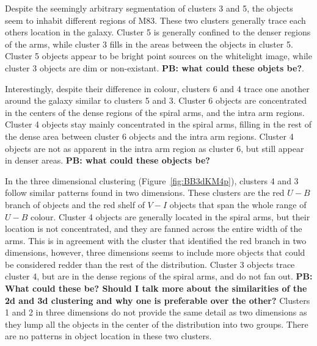 Despite the seemingly arbitrary segmentation of clusters 3 and 5, the objects seem to inhabit different regions of M83.
These two clusters generally trace each others location in the galaxy. 
Cluster 5 is generally confined to the denser regions of the arms, while cluster 3 fills in the areas between the objects in cluster 5.
Cluster 5 objects appear to be bright point sources on the whitelight image, while cluster 3 objects are dim or non-existant.
\textbf{PB: what could these objets be?}.

Interestingly, despite their difference in colour, clusters 6 and 4 trace one another around the galaxy similar to clusters 5 and 3.
Cluster 6 objects are concentrated in the centers of the dense regions of the spiral arms, and the intra arm regions.
Cluster 4 objects stay mainly concentrated in the spiral arms, filling in the rest of the dense area between cluster 6 objects and the intra arm regions.
Cluster 4 objects are not as apparent in the intra arm region as cluster 6, but still appear in denser areas. \textbf{PB: what could these objects be?}

In the three dimensional clustering (Figure~\ref{fig:BB3dKM4p}), clusters 4 and 3 follow similar patterns found in two dimensions.
These clusters are the red $U - B$ branch of objects and the red shelf of $V - I$ objects that span the whole range of $U - B$ colour.
Cluster 4 objects are generally located in the spiral arms, but their location is not concentrated, and they are fanned across the entire width of the arms.
This is in agreement with the cluster that identified the red branch in two dimensions, however, three dimensions seems to include more objects that could be considered redder than the rest of the distribution.
Cluster 3 objects trace cluster 4, but are in the dense regions of the spiral arms, and do not fan out. \textbf{PB: What could these be? Should I talk more about the similarities of the 2d and 3d clustering and why one is preferable over the other?}
Clusters 1 and 2 in three dimensions do not provide the same detail as two dimensions as they lump all the objects in the center of the distribution into two groups.
There are no patterns in object location in these two clusters.

